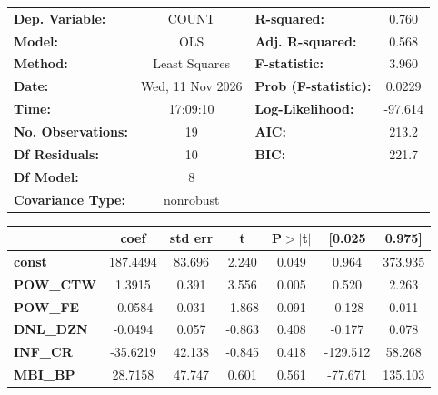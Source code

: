 \begin{center}
\begin{tabular}{lclc}
\toprule
\textbf{Dep. Variable:}    &      COUNT       & \textbf{  R-squared:         } &     0.760   \\
\textbf{Model:}            &       OLS        & \textbf{  Adj. R-squared:    } &     0.568   \\
\textbf{Method:}           &  Least Squares   & \textbf{  F-statistic:       } &     3.960   \\
\textbf{Date:}             & Wed, 11 Nov 2026 & \textbf{  Prob (F-statistic):} &   0.0229    \\
\textbf{Time:}             &     17:09:10     & \textbf{  Log-Likelihood:    } &   -97.614   \\
\textbf{No. Observations:} &          19      & \textbf{  AIC:               } &     213.2   \\
\textbf{Df Residuals:}     &          10      & \textbf{  BIC:               } &     221.7   \\
\textbf{Df Model:}         &           8      & \textbf{                     } &             \\
\textbf{Covariance Type:}  &    nonrobust     & \textbf{                     } &             \\
\bottomrule
\end{tabular}
\begin{tabular}{lcccccc}
                   & \textbf{coef} & \textbf{std err} & \textbf{t} & \textbf{P$> |$t$|$} & \textbf{[0.025} & \textbf{0.975]}  \\
\midrule
\textbf{const}     &     187.4494  &       83.696     &     2.240  &         0.049        &        0.964    &      373.935     \\
\textbf{POW\_CTW}  &       1.3915  &        0.391     &     3.556  &         0.005        &        0.520    &        2.263     \\
\textbf{POW\_FE}   &      -0.0584  &        0.031     &    -1.868  &         0.091        &       -0.128    &        0.011     \\
\textbf{DNL\_DZN}  &      -0.0494  &        0.057     &    -0.863  &         0.408        &       -0.177    &        0.078     \\
\textbf{INF\_CR}   &     -35.6219  &       42.138     &    -0.845  &         0.418        &     -129.512    &       58.268     \\
\textbf{MBI\_BP}   &      28.7158  &       47.747     &     0.601  &         0.561        &      -77.671    &      135.103     \\

\end{tabular}
\end{center}
